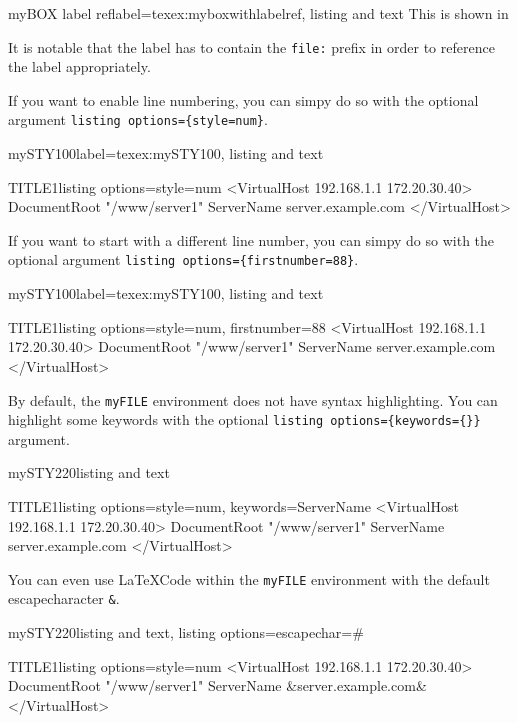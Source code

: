\documentclass[]{myHOWTO-V001}
\begin{document}
\begin{myTEXEXdoclst}{myBOX label ref}{label={texex:myboxwithlabelref}, listing and text}
This is shown in 
\end{myTEXEXdoclst}

It is notable that the label has to contain the \Verb|file:| prefix in order to reference the label appropriately.

If you want to enable line numbering, you can simpy do so with the optional argument \verb|listing options={style=num}|.

\begin{myTEXEXdoclst}{mySTY100}{label={texex:mySTY100}, listing and text}
\begin{myFILElst}{TITLE1}{listing options={style=num}}
<VirtualHost 192.168.1.1 172.20.30.40>
	DocumentRoot "/www/server1"
	ServerName server.example.com
</VirtualHost>
\end{myFILElst}
\end{myTEXEXdoclst}

If you want to start with a different line number, you can simpy do so with the optional argument \verb|listing options={firstnumber=88}|.

\begin{myTEXEXdoclst}{mySTY100}{label={texex:mySTY100}, listing and text}
\begin{myFILElst}{TITLE1}{listing options={style=num, firstnumber=88}}
<VirtualHost 192.168.1.1 172.20.30.40>
	DocumentRoot "/www/server1"
	ServerName server.example.com
</VirtualHost>
\end{myFILElst}
\end{myTEXEXdoclst}

By default, the \Verb|myFILE| environment does not have syntax highlighting. You can highlight some keywords with the optional \verb|listing options={keywords={}}| argument.

\begin{myTEXEXdoclst}{mySTY220}{listing and text}
\begin{myFILElst}{TITLE1}{listing options={style=num, keywords={ServerName}}}
<VirtualHost 192.168.1.1 172.20.30.40>
	DocumentRoot "/www/server1"
	ServerName server.example.com
</VirtualHost>
\end{myFILElst}
\end{myTEXEXdoclst}

You can even use \LaTeX Code within the \Verb|myFILE| environment with the default escapecharacter \Verb|&|.

\begin{myTEXEXdoclst}{mySTY220}{listing and text, listing options={escapechar=\#}}
\begin{myFILElst}{TITLE1}{listing options={style=num}}
<VirtualHost 192.168.1.1 172.20.30.40>
	DocumentRoot "/www/server1"
	ServerName &{\color{red}server.example.com}&
</VirtualHost>
\end{myFILElst}
\end{myTEXEXdoclst}
\end{document}
